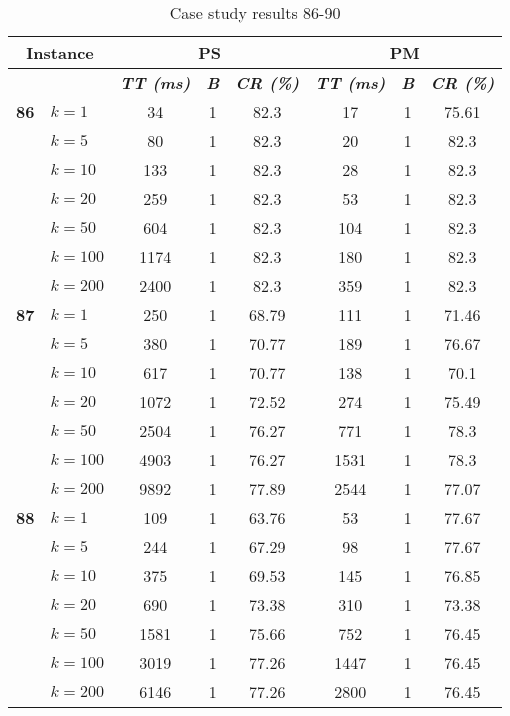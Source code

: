     \begin{table}[htbp]
    \caption{Case study results 86-90}
    \centering
    \begin{tabular}{|l|l|c|c|c|c|c|c|}
    \hline
    \multicolumn{ 2}{|c|}{\textbf{Instance}} & \multicolumn{ 3}{c|}{\textbf{PS}} & \multicolumn{ 3}{c|}{\textbf{PM}} \\ \hline
    \multicolumn{ 2}{|l|}{} & \textbf{\textit{TT (ms)}} & \textbf{\textit{B}} & \textbf{\textit{CR (\%)}} & \textbf{\textit{TT (ms)}} & \textbf{\textit{B}} & \textbf{\textit{CR (\%)}} \\ \hline
    \multicolumn{1}{|r|}{\textbf{86}} & $k=1$ & 34 & 1 & 82.3 & 17 & 1 & 75.61 \\ 
     & $k=5$ & 80 & 1 & 82.3 & 20 & 1 & 82.3 \\ 
     & $k=10$ & 133 & 1 & 82.3 & 28 & 1 & 82.3 \\ 
     & $k=20$ & 259 & 1 & 82.3 & 53 & 1 & 82.3 \\ 
     & $k=50$ & 604 & 1 & 82.3 & 104 & 1 & 82.3 \\ 
     & $k=100$ & 1174 & 1 & 82.3 & 180 & 1 & 82.3 \\ 
     & $k=200$ & 2400 & 1 & 82.3 & 359 & 1 & 82.3 \\ \hline
    \multicolumn{1}{|r|}{\textbf{87}} & $k=1$ & 250 & 1 & 68.79 & 111 & 1 & 71.46 \\ 
     & $k=5$ & 380 & 1 & 70.77 & 189 & 1 & 76.67 \\ 
     & $k=10$ & 617 & 1 & 70.77 & 138 & 1 & 70.1 \\ 
     & $k=20$ & 1072 & 1 & 72.52 & 274 & 1 & 75.49 \\ 
     & $k=50$ & 2504 & 1 & 76.27 & 771 & 1 & 78.3 \\ 
     & $k=100$ & 4903 & 1 & 76.27 & 1531 & 1 & 78.3 \\ 
     & $k=200$ & 9892 & 1 & 77.89 & 2544 & 1 & 77.07 \\ \hline
    \multicolumn{1}{|r|}{\textbf{88}} & $k=1$ & 109 & 1 & 63.76 & 53 & 1 & 77.67 \\ 
     & $k=5$ & 244 & 1 & 67.29 & 98 & 1 & 77.67 \\ 
     & $k=10$ & 375 & 1 & 69.53 & 145 & 1 & 76.85 \\ 
     & $k=20$ & 690 & 1 & 73.38 & 310 & 1 & 73.38 \\ 
     & $k=50$ & 1581 & 1 & 75.66 & 752 & 1 & 76.45 \\ 
     & $k=100$ & 3019 & 1 & 77.26 & 1447 & 1 & 76.45 \\ 
     & $k=200$ & 6146 & 1 & 77.26 & 2800 & 1 & 76.45 \\ \hline

\end{tabular}
\end{table}
